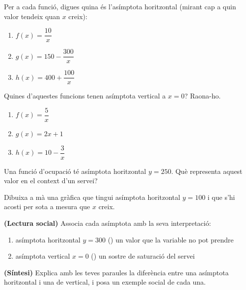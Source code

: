 \begin{exercicis}
\begin{exlist}
  \item Per a cada funció, digues quina és l'asímptota horitzontal (mirant cap a quin
        valor tendeix quan $x$ creix):
        \begin{enumerate}[label=\alph*), leftmargin=1.6em, topsep=2pt]
          \item $f(x)=\dfrac{10}{x}$ \hfill \item $g(x)=150-\dfrac{300}{x}$ \hfill
          \item $h(x)=400+\dfrac{100}{x}$
        \end{enumerate}
  \item Quines d'aquestes funcions tenen asímptota vertical a $x=0$? Raona-ho.
        \begin{enumerate}[label=\alph*), leftmargin=1.6em, topsep=2pt]
          \item $f(x)=\dfrac{5}{x}$ \hfill \item $g(x)=2x+1$ \hfill
          \item $h(x)=10-\dfrac{3}{x}$
        \end{enumerate}
  \item Una funció d'ocupació té asímptota horitzontal $y=250$. Què representa aquest
        valor en el context d'un servei?
  \item Dibuixa a mà una gràfica que tingui asímptota horitzontal $y=100$ i que s'hi
        acosti per sota a mesura que $x$ creix.
  \item \textbf{(Lectura social)} Associa cada asímptota amb la seva interpretació:
        \begin{enumerate}[label=\alph*), leftmargin=1.6em, topsep=2pt]
          \item asímptota horitzontal $y=300$ \quad (\;) un valor que la variable no pot
                prendre
          \item asímptota vertical $x=0$ \quad (\;) un sostre de saturació del servei
        \end{enumerate}
  \item \textbf{(Síntesi)} Explica amb les teves paraules la diferència entre una
        asímptota horitzontal i una de vertical, i posa un exemple social de cada una.
\end{exlist}
\end{exercicis}

